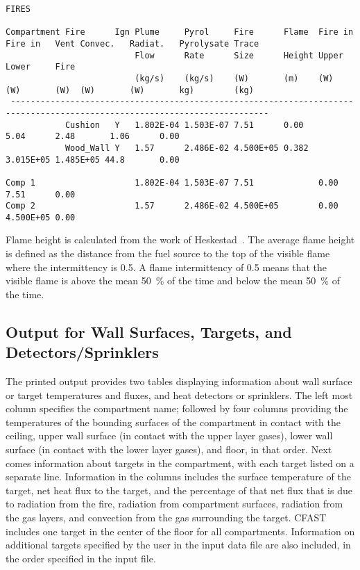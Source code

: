 \begin{lstlisting}[basicstyle=\tiny]
FIRES

Compartment Fire      Ign Plume     Pyrol     Fire      Flame  Fire in Fire in   Vent Convec.   Radiat.   Pyrolysate Trace
                          Flow      Rate      Size      Height Upper   Lower     Fire
                          (kg/s)    (kg/s)    (W)       (m)    (W)     (W)       (W)  (W)       (W)       kg)        (kg)
 --------------------------------------------------------------------------------------------------------------------------
            Cushion   Y   1.802E-04 1.503E-07 7.51      0.00                          5.04      2.48       1.06      0.00
            Wood_Wall Y   1.57      2.486E-02 4.500E+05 0.382                         3.015E+05 1.485E+05 44.8       0.00

Comp 1                    1.802E-04 1.503E-07 7.51             0.00    7.51      0.00
Comp 2                    1.57      2.486E-02 4.500E+05        0.00    4.500E+05 0.00    
\end{lstlisting}
Flame height is calculated from the work of Heskestad~\cite{Heskestad:2002}. The average flame height is defined as the distance from the fuel source to the top of the visible flame where the intermittency is 0.5.  A flame intermittency of 0.5 means that the visible flame is above the mean 50~\% of the time and below the mean 50~\% of the time.

\subsection{Output for Wall Surfaces, Targets, and Detectors/Sprinklers}

The printed output provides two tables displaying information about wall surface or target temperatures and fluxes, and heat detectors or sprinklers. The left most column specifies the compartment name; followed by four columns providing the temperatures of the bounding surfaces of the compartment in contact with the ceiling, upper wall surface (in contact with the upper layer gases), lower wall surface (in contact with the lower layer gases), and floor, in that order. Next comes information about targets in the compartment, with each target listed on a separate line.  Information in the columns includes the surface temperature of the target, net heat flux to the target, and the percentage of that net flux that is due to radiation from the fire, radiation from compartment surfaces, radiation from the gas layers, and convection from the gas surrounding the target.  CFAST includes one target in the center of the floor for all compartments. Information on additional targets specified by the user in the input data file are also included, in the order specified in the input file.

